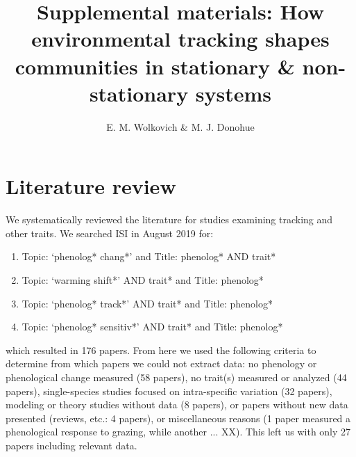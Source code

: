 \documentclass[11pt,letter]{article}
\begin{document}

\renewcommand{\refname}{\CHead{}}

\title{Supplemental materials:  How environmental tracking shapes communities in stationary \& non-stationary systems} 

\author{E. M. Wolkovich \& M. J. Donohue}
\date{} 
\maketitle  %

\section{Literature review}
We systematically reviewed the literature for studies examining tracking and other traits. We searched ISI in August 2019 for:
\begin{enumerate}
\item Topic: `phenolog* chang*' and Title: phenolog* AND trait*
\item Topic: `warming shift*' AND trait* and Title: phenolog*
\item Topic: `phenolog* track*' AND trait* and Title: phenolog*
\item Topic: `phenolog* sensitiv*' AND trait* and Title: phenolog*
\end{enumerate}
which resulted in 176 papers. From here we used the following criteria to determine from which papers we could not extract data: no phenology or phenological change measured (58 papers), no trait(s) measured or analyzed (44 papers), single-species studies focused on intra-specific variation (32 papers), modeling or theory studies without data (8 papers), or papers without new data presented (reviews, etc.: 4 papers), or miscellaneous reasons (1 paper measured a phenological response to grazing, while another ... XX). This left us with only 27 papers including relevant data. 

\end{document}
